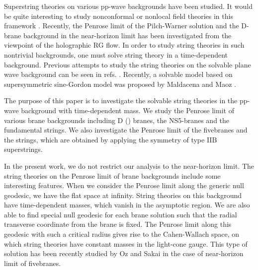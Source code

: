 \documentclass[a4paper,12pt]{article}
\begin{document}
Superstring theories on various pp-wave 
backgrounds have 
been studied.
It would be quite interesting to study nonconformal or nonlocal
field theories in this framework 
\cite{GuNuMaSc,ZaSo,HuRaVe,AlKu2,BiKuPa,AlPa,HaSe}. 
Recently, the Penrose limit of 
the Pilch-Warner solution \cite{CoHaKeWa,GiPaSo,BrJoLoMy} 
and the D\coordHE{}-brane background in the near-horizon
limit \cite{GiPaSo} has been investigated from the viewpoint of the 
holographic RG flow.
In order to study string theories in such nontrivial backgrounds, one
must solve string theory in a time-dependent background.
Previous attempts to study
the string theories on the solvable plane wave
background can be seen in refs. \cite{AmKl,HoSte,VeSa,JoNu,KiKoLu}.
Recently, a solvable model based on \coordHE{} supersymmetric sine-Gordon model 
was  proposed by Maldacena and Maoz \cite{MaMa}.

The purpose of this paper is to investigate the solvable string theories
in the pp-wave background with time-dependent mass.
We study the Penrose limit of various brane backgrounds including 
D\coordHE{} (\coordHE{}) branes, the NS5-branes and the fundamental strings.
We also
investigate the Penrose limit of the \coordHE{} fivebranes and the 
\coordHE{} strings, which are obtained by 
applying the \coordHE{} symmetry of type IIB superstrings.

In the present work, we do not restrict our analysis to  
the near-horizon limit.
The string theories on the Penrose limit of brane backgrounds include 
some interesting features.
When we consider the Penrose limit along the generic null geodesic, 
we have the flat space at infinity.
String theories on this background have time-dependent masses, 
which vanish in the asymptotic region.
We are also able to find special null geodesic for each brane solution 
such that the radial transverse 
coordinate from the brane is fixed. 
The Penrose limit along this geodesic with such a critical radius
gives rise to the Cahen-Wallach
space,
on which string theories have constant masses in the light-cone gauge.
This type of solution has been recently studied by Oz and Sakai 
\cite{OzSa} in the case of near-horizon limit of \coordHE{} fivebranes.
\end{document}
